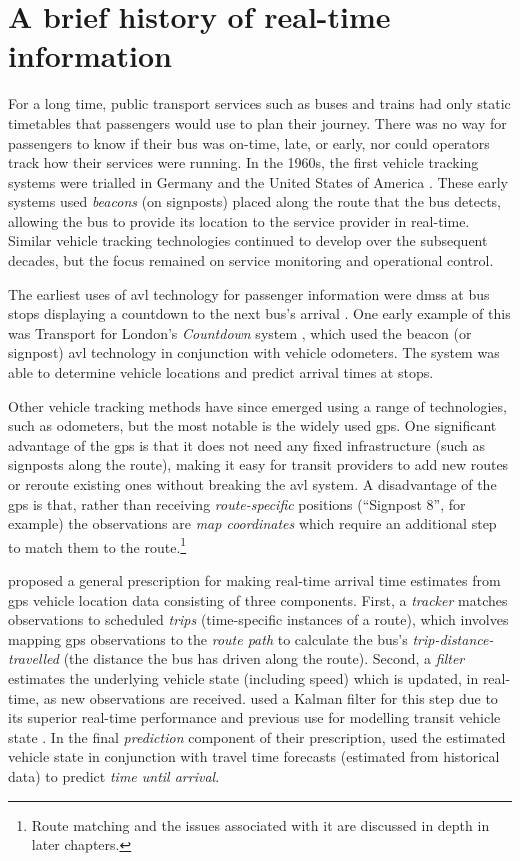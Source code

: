 \section{A brief history of real-time information}

For a long time, public transport services such as buses and trains had only static timetables that passengers would use to plan their journey. There was no way for passengers to know if their bus was on-time, late, or early, nor could operators track how their services were running. In the 1960s, the first vehicle tracking systems were trialled in Germany and the United States of America \citep{TCRP_1997}. These early systems used \emph{beacons} (on signposts) placed along the route that the bus detects, allowing the bus to provide its location to the service provider in real-time. Similar vehicle tracking technologies continued to develop over the subsequent decades, but the focus remained on service monitoring and operational control.


The earliest uses of \gls{avl} technology for passenger information were \glspl{dms} at bus stops displaying a countdown to the next bus's arrival \citep{TCRP_2003}. One early example of this was Transport for London's \emph{Countdown} system \citep{Balogh_1993}, which used the beacon (or signpost) \gls{avl} technology in conjunction with vehicle odometers. The system was able to determine vehicle locations and predict arrival times at stops.


Other vehicle tracking methods have since emerged using a range of technologies, such as odometers, but the most notable is the widely used \gls{gps}. One significant advantage of the \gls{gps} is that it does not need any fixed infrastructure (such as signposts along the route), making it easy for transit providers to add new routes or reroute existing ones without breaking the \gls{avl} system. A disadvantage of the \gls{gps} is that, rather than receiving \emph{route-specific} positions (``Signpost 8'', for example) the observations are \emph{map coordinates} which require an additional step to match them to the route.\footnote{Route matching and the issues associated with it are discussed in depth in later chapters.}


\citet{Cathey_2003} proposed a general prescription for making real-time arrival time estimates from \gls{gps} vehicle location data consisting of three components. First, a \emph{tracker} matches observations to scheduled \emph{trips} (time-specific instances of a route), which involves mapping \gls{gps} observations to the \emph{route path} to calculate the bus's \emph{trip-distance-travelled} (the distance the bus has driven along the route). Second, a \emph{filter} estimates the underlying vehicle state (including speed) which is updated, in real-time, as new observations are received.  used a Kalman filter for this step due to its superior real-time performance and previous use for modelling transit vehicle state \citep{Wall_1999,Dailey_2001}. In the final \emph{prediction} component of their prescription, \citeauthor{Cathey_2003} used the estimated vehicle state in conjunction with travel time forecasts (estimated from historical data) to predict \emph{time until arrival}.


